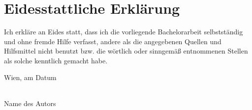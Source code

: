 
\chapter*{Eidesstattliche Erkl\"arung}
\thispagestyle{empty}
\thispagestyle{empty}

\vspace*{2cm}

Ich erkl\"are an Eides statt, dass ich die vorliegende Bachelorarbeit selbstst\"andig und ohne fremde Hilfe verfasst, andere als die angegebenen Quellen und Hilfsmittel nicht benutzt bzw. die w\"ortlich oder sinngem\"a{\ss} entnommenen Stellen als solche kenntlich gemacht habe.

\vspace*{3cm}

\noindent
Wien, am {Datum} %
%
\hfill 
%
\begin{minipage}[t]{5cm}
\centering
\underline{\hspace*{5cm}}\\
\small Name des Autors
\end{minipage}

\cleardoublepage